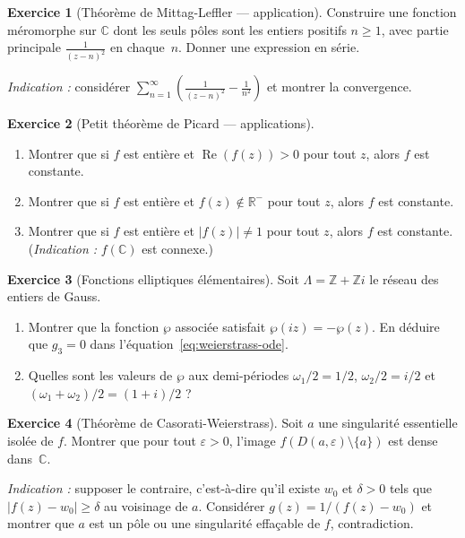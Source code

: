 \documentclass[12pt,a4paper,openany]{book}
\theoremstyle{definition}
\newtheorem{exercice}{Exercice}[chapter]
\theoremstyle{plain}
\theoremstyle{remark}
\newcommand{\C}{\mathbb{C}}
\newcommand{\R}{\mathbb{R}}
\newcommand{\Z}{\mathbb{Z}}
\DeclareMathOperator{\re}{Re}
\newcommand{\abs}[1]{\left|#1\right|}
\begin{document}
\begin{exercice}[Théorème de Mittag-Leffler — application]\label{exo:mittag-leffler-app}
Construire une fonction méromorphe sur $\C$ dont les seuls pôles sont les
entiers positifs $n \geq 1$, avec partie principale $\frac{1}{(z-n)^2}$ en
chaque~$n$. Donner une expression en série.

\textit{Indication :} considérer $\sum_{n=1}^{\infty}
\left(\frac{1}{(z-n)^2} - \frac{1}{n^2}\right)$ et montrer la convergence.
\end{exercice}

\begin{exercice}[Petit théorème de Picard — applications]\label{exo:picard}
\begin{enumerate}[label=(\alph*)]
  \item Montrer que si $f$ est entière et $\re(f(z)) > 0$ pour tout $z$,
    alors $f$ est constante.
  \item Montrer que si $f$ est entière et $f(z) \notin \R^-$ pour tout $z$,
    alors $f$ est constante.
  \item Montrer que si $f$ est entière et $\abs{f(z)} \neq 1$ pour tout $z$,
    alors $f$ est constante. (\textit{Indication :} $f(\C)$ est connexe.)
\end{enumerate}
\end{exercice}

\begin{exercice}[Fonctions elliptiques élémentaires]\label{exo:elliptiques}
Soit $\Lambda = \Z + \Z i$ le réseau des entiers de Gauss.
\begin{enumerate}[label=(\alph*)]
  \item Montrer que la fonction $\wp$ associée satisfait $\wp(iz) = -\wp(z)$.
    En déduire que $g_3 = 0$ dans l'équation~\eqref{eq:weierstrass-ode}.
  \item Quelles sont les valeurs de $\wp$ aux demi-périodes
    $\omega_1/2 = 1/2$, $\omega_2/2 = i/2$ et $(\omega_1+\omega_2)/2 = (1+i)/2$ ?
\end{enumerate}
\end{exercice}

\begin{exercice}[Théorème de Casorati-Weierstrass]\label{exo:casorati}
Soit $a$ une singularité essentielle isolée de $f$. Montrer que pour tout
$\varepsilon > 0$, l'image $f(D(a,\varepsilon) \setminus \{a\})$ est dense
dans~$\C$.

\textit{Indication :} supposer le contraire, c'est-à-dire qu'il existe $w_0$
et $\delta > 0$ tels que $\abs{f(z) - w_0} \geq \delta$ au voisinage de $a$.
Considérer $g(z) = 1/(f(z) - w_0)$ et montrer que $a$ est un pôle ou une
singularité effaçable de $f$, contradiction.
\end{exercice}
\end{document}
